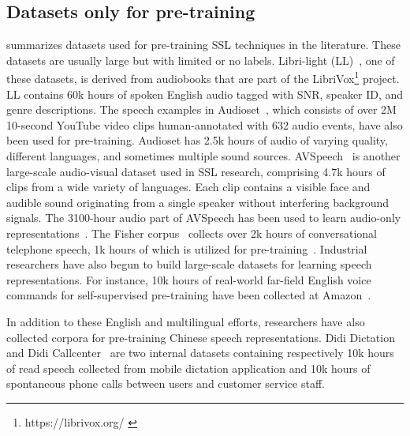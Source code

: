 \subsection{Datasets only for pre-training} 
 summarizes datasets used for pre-training SSL techniques
in the literature. These datasets are usually large but with limited or no
labels. Libri-light (LL)~\cite{kahn2020libri}, one of these datasets, is
derived from audiobooks that are part of the
LibriVox\footnote{https://librivox.org/ \label{librivox}} project. LL contains
60k hours of spoken English audio tagged with SNR, speaker ID, and genre
descriptions. The speech examples in Audioset~\cite{gemmeke2017audio}, which
consists of over 2M 10-second YouTube video clips human-annotated with 632
audio events, have also been used for pre-training. Audioset has 2.5k hours
of audio of varying quality, different languages, and sometimes multiple sound
sources. AVSpeech~\cite{ephrat2018looking} is another large-scale audio-visual
dataset used in SSL research, comprising 4.7k hours of clips from a wide
variety of languages. 
Each clip contains a visible face and audible sound originating from a single
speaker without interfering background signals. The 3100-hour audio part of
AVSpeech has been used to learn audio-only 
representations~\cite{kawakami2020learning}. The Fisher corpus~\cite{cieri2004fisher} collects
over 2k hours of conversational telephone speech, 1k hours of which is utilized
for pre-training~\cite{jiang2021further}. Industrial researchers have also
begun to build large-scale datasets for learning speech representations.
For instance, 10k hours of real-world far-field English voice commands for
self-supervised pre-training have been collected at 
Amazon~\cite{sadhu21_interspeech}. 

In addition to these English and multilingual efforts, researchers have also
collected corpora for pre-training Chinese speech representations. Didi Dictation
and Didi Callcenter~\cite{jiang2019improving, jiang2021further} are two
internal datasets containing respectively 10k hours of read speech collected
from mobile dictation application and 10k hours of spontaneous phone calls
between users and customer service staff.

